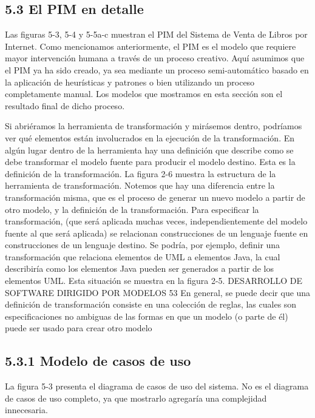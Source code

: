\subsection{5.3 El PIM en detalle }

Las figuras 5-3, 5-4 y 5-5a-c muestran el PIM del Sistema de Venta de Libros por Internet. Como mencionamos anteriormente, el PIM es el modelo que requiere mayor intervención humana a través de un proceso creativo. Aquí asumimos que el PIM ya ha sido creado, ya sea mediante un proceso semi-automático basado en la aplicación de heurísticas y patrones o bien utilizando un proceso completamente manual. Los modelos que mostramos en esta sección son el resultado final de dicho proceso.
 

Si abriéramos la herramienta de transformación y mirásemos dentro, podríamos ver qué elementos están involucrados en la ejecución de la transformación. En algún lugar dentro de la herramienta hay una definición que describe como se debe transformar el modelo fuente para producir el modelo destino. Esta es la definición de la transformación. La figura 2-6 muestra la estructura de la herramienta de transformación. Notemos que hay una diferencia entre la transformación misma, que es el proceso de generar un nuevo modelo a partir de otro modelo, y la definición de la transformación. Para especificar la transformación, (que será aplicada muchas veces, independientemente del modelo fuente al que será aplicada) se relacionan construcciones de un lenguaje fuente en construcciones de un lenguaje destino. Se podría, por ejemplo, definir una transformación que relaciona elementos de UML a elementos Java, la cual describiría como los elementos Java pueden ser generados a partir de los elementos UML. Esta situación se muestra en la figura 2-5. DESARROLLO DE SOFTWARE DIRIGIDO POR MODELOS 53 En general, se puede decir que una definición de transformación consiste en una colección de reglas, las cuales son especificaciones no ambiguas de las formas en que un modelo (o parte de él) puede ser usado para crear otro modelo


\subsection{5.3.1 Modelo de casos de uso}

La figura 5-3 presenta el diagrama de casos de uso del sistema. No es el diagrama de casos de uso completo, ya que mostrarlo agregaría una complejidad innecesaria.

